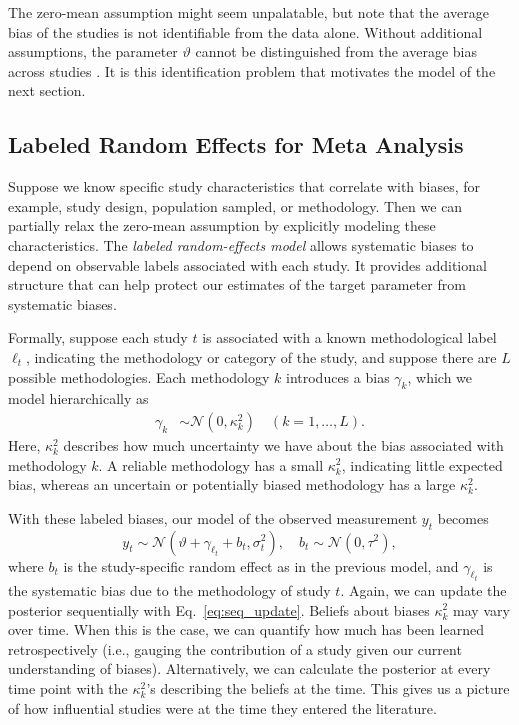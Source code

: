 The zero-mean assumption might seem unpalatable, but note that the average bias of the studies is not identifiable from the data alone. Without additional assumptions, the parameter $\vartheta$ cannot be distinguished from the average bias across studies \citep{gustafson2015bayesian}. It is this identification problem that motivates the model of the next section.

\subsection{Labeled Random Effects for Meta Analysis}
\label{sec:labeled-random-effects-model}

Suppose we know specific study characteristics that correlate with biases, for example, study design, population sampled, or methodology. Then we can partially relax the zero-mean assumption by explicitly modeling these characteristics. The \textit{labeled random-effects model} allows systematic biases to depend on observable labels associated with each study. It provides additional structure that can help protect our estimates of the target parameter from systematic biases.

Formally, suppose each study $t$ is associated with a known methodological label $\ell_t$, indicating the methodology or category of the study, and suppose there are $L$ possible methodologies. Each methodology $k$ introduces a bias $\gamma_k$, which we model hierarchically as
\begin{align}
  \gamma_k &\sim \mathcal{N}(0, \kappa_k^2) \quad ( k = 1, \dots, L).
\end{align}
Here, $\kappa_k^2$ describes how much uncertainty we have about the bias associated with methodology $k$. A reliable methodology has a small $\kappa_k^2$, indicating little expected bias, whereas an uncertain or potentially biased methodology has a large $\kappa_k^2$.

With these labeled biases, our model of the observed measurement $y_t$ becomes
\[
  y_t \sim \mathcal{N}(\vartheta + \gamma_{\ell_t} + b_t, \sigma_t^2), \quad b_t \sim \mathcal{N}(0, \tau^2),
\]
where $b_t$ is the study-specific random effect as in the previous model, and $\gamma_{\ell_t}$ is the systematic bias due to the methodology of study $t$. Again, we can update the posterior sequentially with
Eq.~\ref{eq:seq_update}.
Beliefs about biases $\kappa^2_k$ may vary over time. When this is the case, we can quantify how much has been learned retrospectively (i.e., gauging the contribution of a study given our current understanding of biases). Alternatively, we can calculate the posterior at every time point with the $\kappa^2_k$'s describing the beliefs at the time. This gives us a picture of how influential studies were at the time they entered the literature.

